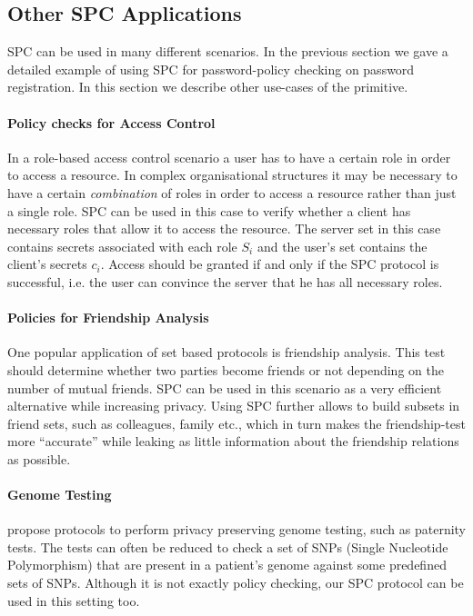 \subsection{Other SPC Applications}\label{sec:generalisation}
SPC can be used in many different scenarios.
In the previous section we gave a detailed example of using SPC for password-policy checking on password registration.
In this section we describe other use-cases of the primitive.

\paragraph{Policy checks for Access Control}
In a role-based access control scenario \cite{FerraioloK09} a user has to have a certain role in order to access a resource.
In complex organisational structures it may be necessary to have a certain \emph{combination} of roles in order to access a resource rather than just a single role.
SPC can be used in this case to verify whether a client has necessary roles that allow it to access the resource.
The server set \cS in this case contains secrets associated with each role $S_i$ and the user's set \cC contains the client's secrets $c_i$.
Access should be granted if and only if the SPC protocol is successful, i.e. the user can convince the server that he has all necessary roles.

\paragraph{Policies for Friendship Analysis}
One popular application of set based protocols is friendship analysis.
This test should determine whether two parties become friends or not depending on the number of mutual friends.
SPC can be used in this scenario as a very efficient alternative while increasing privacy.
Using SPC further allows to build subsets in friend sets, such as colleagues, family etc., which in turn makes the friendship-test more ``accurate'' while leaking as little information about the friendship relations as possible.

\paragraph{Genome Testing}
\citet{BaldiBCGT11} propose protocols to perform privacy preserving genome testing, such as paternity tests. 
The tests can often be reduced to check a set of SNPs (Single Nucleotide Polymorphism) that are present in a patient's genome against some predefined sets of SNPs. Although it is not exactly policy checking, our SPC protocol can be used in this setting too. 


